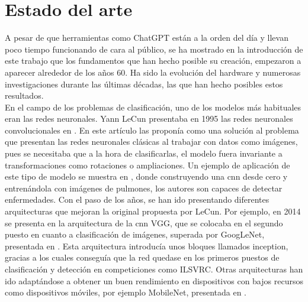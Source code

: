 \chapter{Estado del arte}\label{chapter:estado_arte}

	A pesar de que herramientas como ChatGPT están a la orden del día y llevan poco tiempo funcionando de cara al público, se ha mostrado en la introducción de este trabajo que los fundamentos que han hecho posible su creación, empezaron a aparecer alrededor de los años 60. Ha sido la evolución del hardware y numerosas investigaciones durante las últimas décadas, las que han hecho posibles estos resultados. \\
	
	En el campo de los problemas de clasificación, uno de los modelos más habituales eran las redes neuronales. Yann LeCun presentaba en 1995 las redes neuronales convolucionales en \cite{ea_cnn}. En este artículo las proponía como una solución al problema que presentan las redes neuronales clásicas al trabajar con datos como imágenes, pues se necesitaba que a la hora de clasificarlas, el modelo fuera invariante a transformaciones como rotaciones o ampliaciones. Un ejemplo de aplicación de este tipo de modelo se muestra en \cite{medicos_ea}, donde construyendo una \gls{cnn} desde cero y entrenándola con imágenes de pulmones, los autores son capaces de detectar enfermedades. Con el paso de los años, se han ido presentando diferentes arquitecturas que mejoran la original propuesta por LeCun. Por ejemplo, en 2014 se presenta en \cite{ea_vgg} la arquitectura de la \gls{cnn} VGG, que se colocaba en el segundo puesto en cuanto a clasificación de imágenes, superada por GoogLeNet, presentada en \cite{googlenet_ea}. Esta arquitectura introducía unos bloques llamados inception, gracias a los cuales conseguía que la red quedase en los primeros puestos de clasificación y detección en competiciones como ILSVRC. Otras arquitecturas han ido adaptándose a obtener un buen rendimiento en dispositivos con bajos recursos como dispositivos móviles, por ejemplo MobileNet, presentada en \cite{mobilenet_ea}. \\
	
